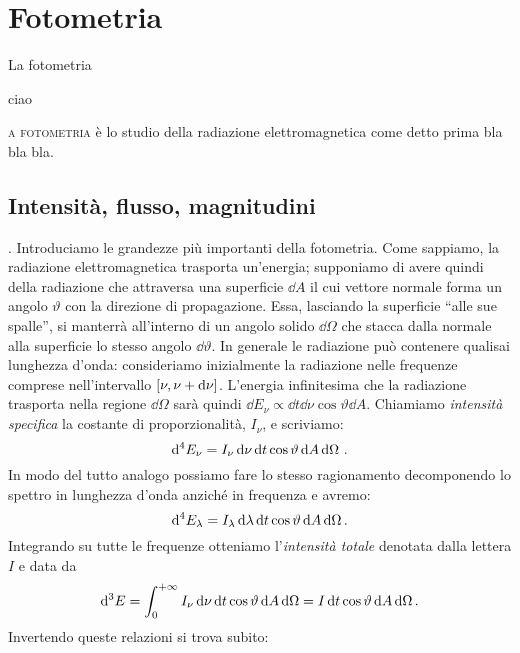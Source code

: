 \chapter{Fotometria}\label{ch:fotometria}
\epigraph{La fotometria}{ciao}
\noindent{}\textsc{a fotometria} è lo studio della radiazione elettromagnetica come detto prima bla bla bla. \lipsum[1]
\section{Intensità, flusso, magnitudini}.
    Introduciamo le grandezze più importanti della fotometria. Come sappiamo, la radiazione elettromagnetica trasporta un'energia; supponiamo di avere quindi della radiazione che attraversa una superficie $\dd A$ il cui vettore normale forma un angolo $\vartheta$ con la direzione di propagazione. Essa, lasciando la superficie ``alle sue spalle'', si manterrà all'interno di un angolo solido $\dd\Omega$ che stacca dalla normale alla superficie lo stesso angolo $\dd\vartheta$. In generale le radiazione può contenere qualisai lunghezza d'onda: consideriamo inizialmente la radiazione nelle frequenze comprese nell'intervallo  $\bqty{\nu,\nu + \dd\nu}$. L'energia infinitesima che la radiazione trasporta nella regione $\dd\Omega$ sarà quindi $\dd E_\nu \propto \dd t \dd\nu \cos\vartheta\dd A$. Chiamiamo \emph{intensità specifica} la costante di proporzionalità, $I_\nu$, e scriviamo:
    \begin{equation}
        \label{intensità-specifica-freq}
        \dd[4] E_\nu = I_{\nu} \dd{\nu} \dd{t} \cos{\vartheta} \dd{A} \dd{\Omega}
        \,.
    \end{equation}
    In modo del tutto analogo possiamo fare lo stesso ragionamento decomponendo lo spettro in lunghezza d'onda anziché in frequenza e avremo:
    \begin{equation}
        \label{intensità-specifica-freq}
        \dd[4] E_\lambda = I_\lambda \,\dd\lambda\,\dd t\cos\vartheta\,\dd A \,\dd\Omega
        \,.
    \end{equation}
    Integrando su tutte le frequenze otteniamo l'\emph{intensità totale} denotata dalla lettera $I$ e data da
    \begin{equation}
        \label{intensità-totale}
        \dd[3] E = \int_{0}^{+\infty}I_\nu \,\dd\nu\,\dd t\cos\vartheta\,\dd A \,\dd\Omega = I \,\dd t\cos\vartheta\,\dd A \,\dd\Omega
        \,.
    \end{equation}
    Invertendo queste relazioni si trova subito:
